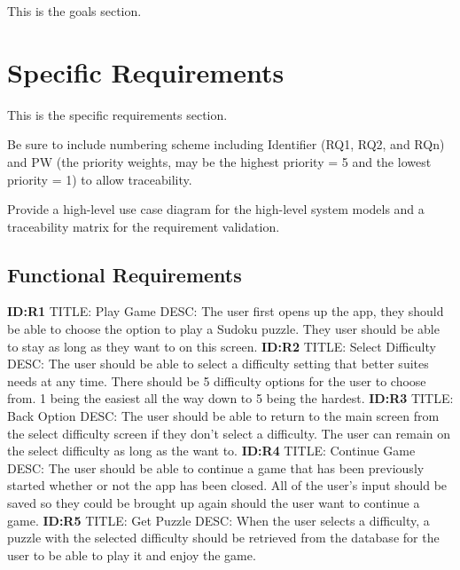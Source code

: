 \documentclass{article}
\begin{document}
This is the goals section. 


 
\section{Specific Requirements}
This is the specific requirements section.

Be sure to include numbering scheme including Identifier (RQ1, RQ2, and RQn) and PW (the priority weights, may be the highest priority = 5 and the lowest priority = 1) to allow traceability.

Provide a high-level use case diagram for the high-level system models and a traceability matrix for the requirement validation.
 
\subsection{Functional Requirements}
\textbf{ID:R1} \newline TITLE: Play Game \newline DESC: The user first opens up the app, they should be able to choose the option to play a Sudoku puzzle. They user should be able to stay as long as they want to on this screen.\newline
\textbf{ID:R2} \newline TITLE: Select Difficulty \newline DESC: The user should be able to select a difficulty setting that better suites needs at any time. There should be 5 difficulty options for the user to choose from. 1 being the easiest all the way down to 5 being the hardest.\newline 
\textbf{ID:R3} \newline TITLE: Back Option \newline DESC: The user should be able to return to the main screen from the select difficulty screen if they don't select a difficulty. The user can remain on the select difficulty as long as the want to.\newline
\textbf{ID:R4} \newline TITLE: Continue Game \newline DESC: The user should be able to continue a game that has been previously started whether or not the app has been closed. All of the user's input should be saved so they could be brought up again should the user want to continue a game.\newline 
\textbf{ID:R5} \newline TITLE: Get Puzzle \newline DESC: When the user selects a difficulty, a puzzle with the selected difficulty should be retrieved from the database for the user to be able to play it and enjoy the game.\newline 
\end{document}
